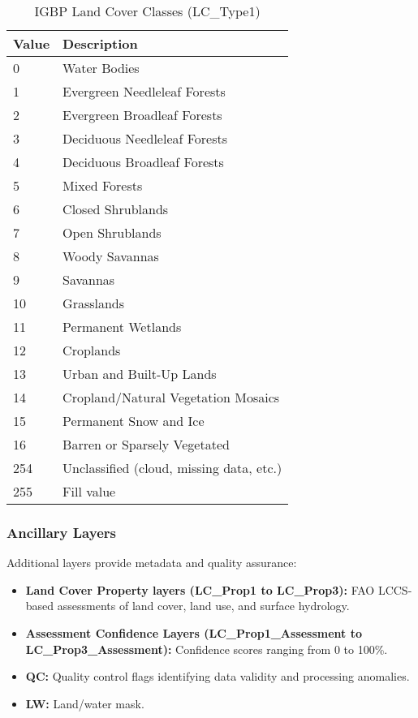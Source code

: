 \begin{table}[htbp]
    \centering
    \caption{IGBP Land Cover Classes (LC\_Type1)}
    \label{tab:igbp_classes}
    \begin{tabular}{ll}
        \toprule
        \textbf{Value} & \textbf{Description} \\
        \midrule
        0 & Water Bodies \\
        1 & Evergreen Needleleaf Forests \\
        2 & Evergreen Broadleaf Forests \\
        3 & Deciduous Needleleaf Forests \\
        4 & Deciduous Broadleaf Forests \\
        5 & Mixed Forests \\
        6 & Closed Shrublands \\
        7 & Open Shrublands \\
        8 & Woody Savannas \\
        9 & Savannas \\
        10 & Grasslands \\
        11 & Permanent Wetlands \\
        12 & Croplands \\
        13 & Urban and Built-Up Lands \\
        14 & Cropland/Natural Vegetation Mosaics \\
        15 & Permanent Snow and Ice \\
        16 & Barren or Sparsely Vegetated \\
        254 & Unclassified (cloud, missing data, etc.) \\
        255 & Fill value \\
        \bottomrule
    \end{tabular}
\end{table}

\subsubsection{Ancillary Layers}
Additional layers provide metadata and quality assurance:
\begin{itemize}
    \item \textbf{Land Cover Property layers (LC\_Prop1 to LC\_Prop3):} FAO LCCS-based assessments of land cover, land use, and surface hydrology.
    \item \textbf{Assessment Confidence Layers (LC\_Prop1\_Assessment to LC\_Prop3\_Assessment):} Confidence scores ranging from 0 to 100\%.
    \item \textbf{QC:} Quality control flags identifying data validity and processing anomalies.
    \item \textbf{LW:} Land/water mask.
\end{itemize}

